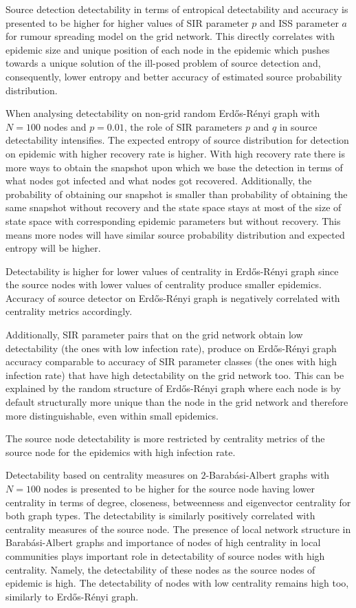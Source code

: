 \documentclass[times, utf8, diplomski]{fer}
\begin{document}
Source detection detectability in terms of entropical detectability and accuracy is presented to be higher for higher values of SIR parameter $p$ and ISS parameter $a$ for rumour spreading model on the grid network. This directly correlates with epidemic size and unique position of each node in the epidemic which pushes towards a unique solution of the ill-posed problem of source detection and, consequently, lower entropy and better accuracy of estimated source probability distribution.

When analysing detectability on non-grid random Erd{\H{o}}s-R{\'{e}}nyi graph with $N=100$ nodes and $p=0.01$,  the role of SIR parameters $p$ and $q$  in source detectability intensifies. The expected entropy of source distribution for  detection on  epidemic with higher recovery rate is higher. With high recovery rate there is more ways to obtain the snapshot upon which we base the detection in terms of what nodes got infected and what nodes got recovered. Additionally, the probability of obtaining our snapshot is smaller than probability of obtaining the same snapshot without recovery and the state space stays at most of the size of state space with corresponding epidemic parameters but without recovery. This means more nodes will have similar source probability distribution and expected entropy will be higher.

Detectability is higher for lower values of centrality in Erd{\H{o}}s-R{\'{e}}nyi graph since the source nodes with lower values of centrality produce smaller epidemics. Accuracy of source detector on Erd{\H{o}}s-R{\'{e}}nyi graph is negatively correlated with centrality metrics accordingly.

Additionally, SIR parameter pairs that on the grid network obtain low detectability (the ones with low infection rate), produce on Erd{\H{o}}s-R{\'{e}}nyi graph accuracy comparable to accuracy of  SIR parameter classes (the ones with high infection rate) that have high detectability on the grid network too. This can be explained by the random structure of Erd{\H{o}}s-R{\'{e}}nyi graph where each node is by default structurally more unique than the node in the grid network and therefore  more distinguishable, even within small epidemics. 

The source node detectability is more restricted by centrality metrics of the source node for the epidemics with high infection rate. 

 Detectability based on centrality measures on  $2$-Barab\'{a}si-Albert graphs with $N = 100$ nodes is presented to be higher for the source node having lower centrality in terms of degree, closeness, betweenness and eigenvector centrality for both graph types. The detectability is similarly positively correlated with centrality measures of the source node. The presence of local network structure in Barab\'{a}si-Albert graphs and importance of nodes of high centrality in local communities plays important role in detectability of source nodes with high centrality. Namely, the detectability of these nodes as the source nodes of epidemic is high. The detectability of nodes with low centrality remains high too, similarly to Erd{\H{o}}s-R{\'{e}}nyi graph.
 
\end{document}
